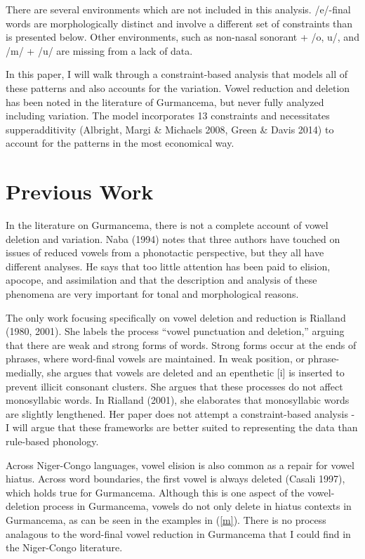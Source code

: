 \documentclass[output=paper,
modfonts
]{langscibook}
\begin{document}
\z

There are several environments which are not included in this analysis. /e/-final words are morphologically distinct and involve a different set of constraints than is presented below. Other environments, such as non-nasal sonorant + /o, u/, and /m/ + /u/ are missing from a lack of data. 

In this paper, I will walk through a constraint-based analysis that models all of these patterns and also accounts for the variation. Vowel reduction and deletion has been noted in the literature of Gurmancema, but never fully analyzed including variation. The model incorporates 13 constraints and necessitates supperadditivity (Albright, Margi \& Michaels 2008, Green \& Davis 2014) to account for the patterns in the most economical way. 



\section{Previous Work} 

In the literature on Gurmancema, there is not a complete account of vowel deletion and variation. Naba (1994) notes that three authors have touched on issues of reduced vowels from a phonotactic perspective, but they all have different analyses. He says that too little attention has been paid to elision, apocope, and assimilation and that the description and analysis of these phenomena are very important for tonal and morphological reasons.

The only work focusing specifically on vowel deletion and reduction is Rialland (1980, 2001). She labels the process “vowel punctuation and deletion,'' arguing that there are weak and strong forms of words.  Strong forms occur at the ends of phrases, where word-final vowels are maintained. In weak position, or phrase-medially, she argues that vowels are deleted and an epenthetic [i] is inserted to prevent illicit consonant clusters. She argues that these processes do not affect monosyllabic words. In Rialland (2001), she elaborates that monosyllabic words are slightly lengthened. Her paper does not attempt a constraint-based analysis - I will argue that these frameworks are better suited to representing the data than rule-based phonology. 
	
Across Niger-Congo languages, vowel elision is also common as a repair for vowel hiatus. Across word boundaries, the first vowel is always deleted (Casali 1997), which holds true for Gurmancema. Although this is one aspect of the vowel-deletion process in Gurmancema, vowels do not only delete in hiatus contexts in Gurmancema, as can be seen in the examples in (\ref{m}). There is no process analagous to the word-final vowel reduction in Gurmancema that I could find in the Niger-Congo literature. 
 
\end{document}
